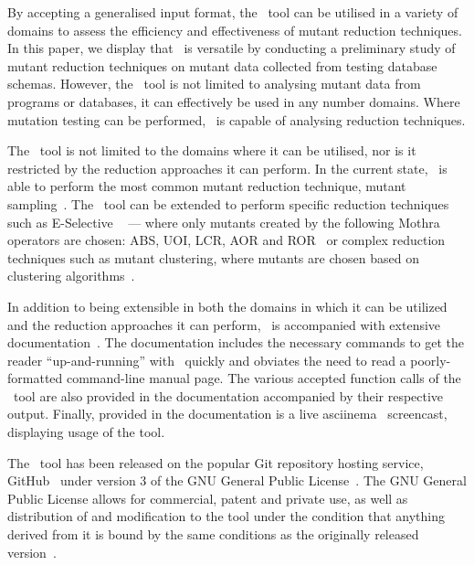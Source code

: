 By accepting a generalised input format, the \mr~tool can be utilised in a variety of domains to assess the efficiency
and effectiveness of mutant reduction techniques.  In this paper, we display that \mr~is versatile by conducting a
preliminary study of mutant reduction techniques on mutant data collected from testing database schemas.  However, the
\mr~tool is not limited to analysing mutant data from programs or databases, it can effectively be used in any number
domains. Where mutation testing can be performed, \mr~is capable of analysing reduction techniques.




The \mr~tool is not limited to the domains where it can be utilised, nor is it restricted
by the reduction approaches it can perform. In the current state, \mr~is able to perform
the most common mutant reduction technique, mutant sampling~\cite{gopinath2015mutation, jia2011analysis, gopinath2015empirical}.
The \mr~tool can be extended to perform specific reduction techniques such as E-Selective
~\cite{offutt1996experimental} --- where only mutants created by the following Mothra operators
are chosen: ABS, UOI, LCR, AOR and ROR~\cite{gopinath2015empirical} or complex reduction techniques
such as mutant clustering, where mutants are chosen based on clustering algorithms~\cite{jia2011analysis}.

In addition to being extensible in both the domains in which it can be utilized and the
reduction approaches it can perform, \mr~is accompanied with extensive documentation~\cite{tool}.
The documentation includes the necessary commands to get the reader ``up-and-running''
with \mr~quickly and obviates the need to read a poorly-formatted command-line manual page.
The various accepted function calls of the \mr~tool are also provided in the documentation
accompanied by their respective output. Finally, provided in the documentation is a live
asciinema~\cite{asciinema} screencast, displaying usage of the tool.

The \mr~tool has been released on the popular Git repository hosting service, GitHub~\cite{github}
under version 3 of the GNU General Public License~\cite{license}. The GNU General Public License
allows for commercial, patent and private use, as well as distribution of and modification to the tool
under the condition that anything derived from it is bound by the same conditions as the originally
released version~\cite{copyleft}.

% 
% 
% 
